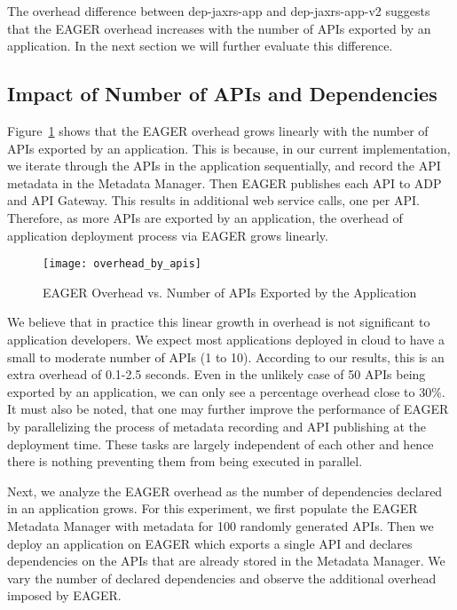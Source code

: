 The overhead difference between dep-jaxrs-app and dep-jaxrs-app-v2 suggests that the EAGER overhead increases with the number
of APIs exported by an application. In the next section we will further evaluate this difference.

\subsection{Impact of Number of APIs and Dependencies}

Figure~\ref{fig:overhead_by_apis} shows that the EAGER overhead grows linearly with the number of APIs exported by an application.
This is because, in our current implementation, we iterate through the APIs in the application sequentially, and record the API metadata in the
Metadata Manager. Then EAGER publishes each API to ADP and API Gateway. This results in 
additional web service calls, one per API. Therefore, as more APIs are exported 
by an application, the overhead of application deployment process via EAGER grows linearly. 

\begin{figure}
\centering
\texttt{[image: overhead\_by\_apis]}
\caption{EAGER Overhead vs. Number of APIs Exported by the Application}
\label{fig:overhead_by_apis}
\end{figure}

We believe that in practice this linear growth in overhead is not significant to application developers.
We expect most applications deployed in cloud to have a small to moderate number of APIs (1 to 10). According to our results, this is an 
extra overhead of 0.1-2.5 seconds. Even in the
unlikely case of 50 APIs being exported by an application, we can only see a percentage overhead close to 30\%. It must also be noted, that
one may further improve the performance of EAGER by parallelizing the process of metadata recording and API publishing at the deployment
time. These tasks are largely independent of each other and hence there is nothing preventing them from being executed in parallel. %

Next, we analyze the EAGER overhead as the number of dependencies declared in an application grows. For this experiment, we first populate 
the EAGER Metadata Manager with metadata for 100 randomly generated APIs. Then we deploy an application on EAGER which exports a single
API and declares dependencies on the APIs that are already stored in the Metadata Manager. We vary the number of declared dependencies and
observe the additional overhead imposed by EAGER.

